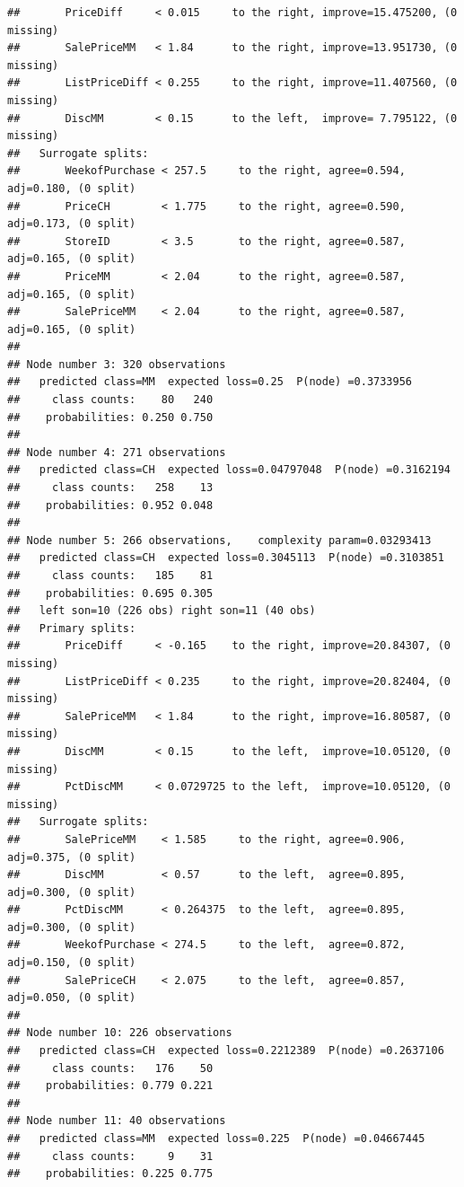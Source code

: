 \documentclass[
]{book}
\begin{document}
\begin{verbatim}
##       PriceDiff     < 0.015     to the right, improve=15.475200, (0 missing)
##       SalePriceMM   < 1.84      to the right, improve=13.951730, (0 missing)
##       ListPriceDiff < 0.255     to the right, improve=11.407560, (0 missing)
##       DiscMM        < 0.15      to the left,  improve= 7.795122, (0 missing)
##   Surrogate splits:
##       WeekofPurchase < 257.5     to the right, agree=0.594, adj=0.180, (0 split)
##       PriceCH        < 1.775     to the right, agree=0.590, adj=0.173, (0 split)
##       StoreID        < 3.5       to the right, agree=0.587, adj=0.165, (0 split)
##       PriceMM        < 2.04      to the right, agree=0.587, adj=0.165, (0 split)
##       SalePriceMM    < 2.04      to the right, agree=0.587, adj=0.165, (0 split)
## 
## Node number 3: 320 observations
##   predicted class=MM  expected loss=0.25  P(node) =0.3733956
##     class counts:    80   240
##    probabilities: 0.250 0.750 
## 
## Node number 4: 271 observations
##   predicted class=CH  expected loss=0.04797048  P(node) =0.3162194
##     class counts:   258    13
##    probabilities: 0.952 0.048 
## 
## Node number 5: 266 observations,    complexity param=0.03293413
##   predicted class=CH  expected loss=0.3045113  P(node) =0.3103851
##     class counts:   185    81
##    probabilities: 0.695 0.305 
##   left son=10 (226 obs) right son=11 (40 obs)
##   Primary splits:
##       PriceDiff     < -0.165    to the right, improve=20.84307, (0 missing)
##       ListPriceDiff < 0.235     to the right, improve=20.82404, (0 missing)
##       SalePriceMM   < 1.84      to the right, improve=16.80587, (0 missing)
##       DiscMM        < 0.15      to the left,  improve=10.05120, (0 missing)
##       PctDiscMM     < 0.0729725 to the left,  improve=10.05120, (0 missing)
##   Surrogate splits:
##       SalePriceMM    < 1.585     to the right, agree=0.906, adj=0.375, (0 split)
##       DiscMM         < 0.57      to the left,  agree=0.895, adj=0.300, (0 split)
##       PctDiscMM      < 0.264375  to the left,  agree=0.895, adj=0.300, (0 split)
##       WeekofPurchase < 274.5     to the left,  agree=0.872, adj=0.150, (0 split)
##       SalePriceCH    < 2.075     to the left,  agree=0.857, adj=0.050, (0 split)
## 
## Node number 10: 226 observations
##   predicted class=CH  expected loss=0.2212389  P(node) =0.2637106
##     class counts:   176    50
##    probabilities: 0.779 0.221 
## 
## Node number 11: 40 observations
##   predicted class=MM  expected loss=0.225  P(node) =0.04667445
##     class counts:     9    31
##    probabilities: 0.225 0.775
\end{verbatim}
\end{document}
